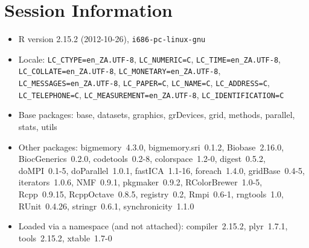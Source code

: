 \documentclass[10pt]{article}
\begin{document}
\section*{Session Information}
\begin{itemize}\raggedright
  \item R version 2.15.2 (2012-10-26), \verb|i686-pc-linux-gnu|
  \item Locale: \verb|LC_CTYPE=en_ZA.UTF-8|, \verb|LC_NUMERIC=C|, \verb|LC_TIME=en_ZA.UTF-8|, \verb|LC_COLLATE=en_ZA.UTF-8|, \verb|LC_MONETARY=en_ZA.UTF-8|, \verb|LC_MESSAGES=en_ZA.UTF-8|, \verb|LC_PAPER=C|, \verb|LC_NAME=C|, \verb|LC_ADDRESS=C|, \verb|LC_TELEPHONE=C|, \verb|LC_MEASUREMENT=en_ZA.UTF-8|, \verb|LC_IDENTIFICATION=C|
  \item Base packages: base, datasets, graphics, grDevices, grid,
    methods, parallel, stats, utils
  \item Other packages: bigmemory~4.3.0, bigmemory.sri~0.1.2,
    Biobase~2.16.0, BiocGenerics~0.2.0, codetools~0.2-8,
    colorspace~1.2-0, digest~0.5.2, doMPI~0.1-5, doParallel~1.0.1,
    fastICA~1.1-16, foreach~1.4.0, gridBase~0.4-5, iterators~1.0.6,
    NMF~0.9.1, pkgmaker~0.9.2, RColorBrewer~1.0-5, Rcpp~0.9.15,
    RcppOctave~0.8.5, registry~0.2, Rmpi~0.6-1, rngtools~1.0,
    RUnit~0.4.26, stringr~0.6.1, synchronicity~1.1.0
  \item Loaded via a namespace (and not attached): compiler~2.15.2,
    plyr~1.7.1, tools~2.15.2, xtable~1.7-0
\end{itemize}
\end{document}
